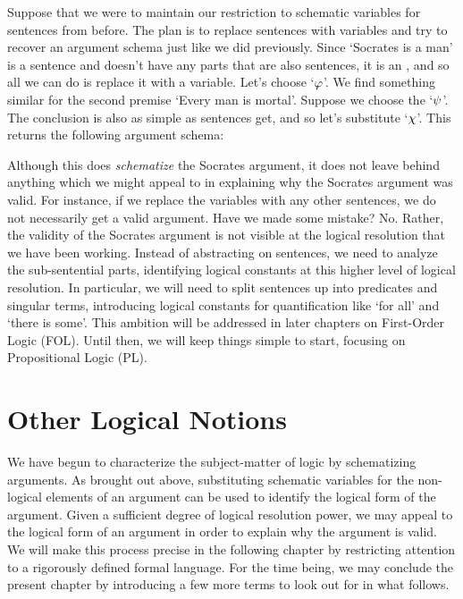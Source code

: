 Suppose that we were to maintain our restriction to schematic variables for sentences from before.
The plan is to replace sentences with variables and try to recover an argument schema just like we did previously.
Since `Socrates is a man' is a sentence and doesn't have any parts that are also sentences, it is an , and so all we can do is replace it with a variable.
Let's choose `$\metaA$'. 
We find something similar for the second premise `Every man is mortal'.
Suppose we choose the `$\metaB$'.
The conclusion is also as simple as sentences get, and so let's substitute `$\metaC$'.
This returns the following argument schema:

\begin{earg}
  \eitem{$\metaA$}
  \uitem{$\metaB$\quad}
  \eitem{$\metaC$}
\end{earg}

Although this does \textit{schematize} the Socrates argument, it does not leave behind anything which we might appeal to in explaining why the Socrates argument was valid.
For instance, if we replace the variables with any other sentences, we do not necessarily get a valid argument.
Have we made some mistake?
No.
Rather, the validity of the Socrates argument is not visible at the logical resolution that we have been working.
Instead of abstracting on sentences, we need to analyze the sub-sentential parts, identifying logical constants at this higher level of logical resolution.
In particular, we will need to split sentences up into predicates and singular terms, introducing logical constants for quantification like `for all' and `there is some'.
This ambition will be addressed in later chapters on First-Order Logic (FOL).
Until then, we will keep things simple to start, focusing on Propositional Logic (PL).





\section{Other Logical Notions}

We have begun to characterize the subject-matter of logic by schematizing arguments.
As brought out above, substituting schematic variables for the non-logical elements of an argument can be used to identify the logical form of the argument.
Given a sufficient degree of logical resolution power, we may appeal to the logical form of an argument in order to explain why the argument is valid.
We will make this process precise in the following chapter by restricting attention to a rigorously defined formal language.
For the time being, we may conclude the present chapter by introducing a few more terms to look out for in what follows.


